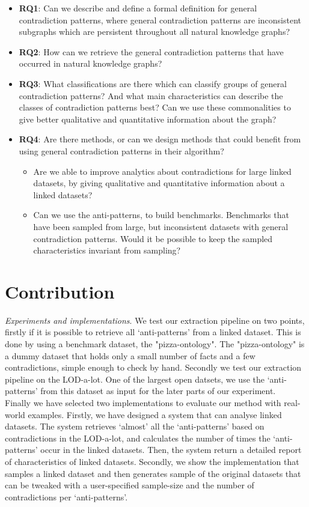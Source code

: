 \documentclass[11pt,letterpaper ,oneside ]{book}
\begin{document}
\begin{itemize}
	\item \textbf{RQ1}: Can we describe and define a formal definition for general contradiction patterns, where general contradiction patterns are inconsistent subgraphs which are persistent throughout all natural knowledge graphs?
	\item \textbf{RQ2}: How can we retrieve the general contradiction patterns that have occurred in natural knowledge graphs? 
	\item \textbf{RQ3}: What classifications are there which can classify groups of general contradiction patterns? And what main characteristics can describe the classes of contradiction patterns best? Can we use these commonalities to give better qualitative and quantitative information about the graph?
	\item \textbf{RQ4}: Are there methods, or can we design methods that could benefit from using general contradiction patterns in their algorithm? 
	\begin{itemize}
		\item Are we able to improve analytics about contradictions for large linked datasets, by giving qualitative and quantitative information about a linked datasets?
		\item Can we use the anti-patterns, to build benchmarks. Benchmarks that have been sampled from large, but inconsistent datasets with general contradiction patterns. Would it be possible to keep the sampled characteristics invariant from sampling?
	\end{itemize}
\end{itemize}

\section{Contribution}
\textit{Experiments and implementations}. We test our extraction pipeline on two points, firstly if it is possible to retrieve all `anti-patterns' from a linked dataset. This is done by using a benchmark dataset, the "pizza-ontology". The "pizza-ontology" is a dummy dataset that holds only a small number of facts and a few contradictions, simple enough to check by hand. Secondly we test our extraction pipeline on the LOD-a-lot. One of the largest open datsets, we use the `anti-patterns' from this dataset as input for the later parts of our experiment.\\

Finally we have selected two implementations to evaluate our method with real-world examples. Firstly, we have designed a system that can analyse linked datasets. The system retrieves `almost' all the  `anti-patterns' based on contradictions in the LOD-a-lot, and calculates the number of times the `anti-patterns' occur in the linked datasets. Then, the system return a detailed report of characteristics of linked datasets.
Secondly, we show the implementation that samples a linked dataset and then generates sample of the original datasets that can be tweaked with a user-specified sample-size and the number of contradictions per `anti-patterns'. \\
\end{document}
